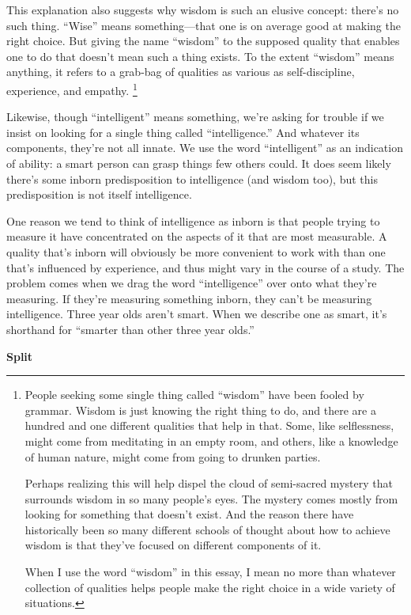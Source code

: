 This explanation also suggests why wisdom is such an elusive concept:
there's no such thing. ``Wise'' means something---that one is on average
good at making the right choice. But giving the name ``wisdom'' to the
supposed quality that enables one to do that doesn't mean such a thing
exists. To the extent ``wisdom'' means anything, it refers to a grab-bag
of qualities as various as self-discipline, experience, and empathy.
\footnote{People seeking some single thing called ``wisdom'' have been
fooled by grammar. Wisdom is just knowing the right thing to do, and
there are a hundred and one different qualities that help in that. Some,
like selflessness, might come from meditating in an empty room, and
others, like a knowledge of human nature, might come from going to
drunken parties.

Perhaps realizing this will help dispel the cloud of semi-sacred mystery
that surrounds wisdom in so many people's eyes. The mystery comes mostly
from looking for something that doesn't exist. And the reason there have
historically been so many different schools of thought about how to
achieve wisdom is that they've focused on different components of it.

When I use the word ``wisdom'' in this essay, I mean no more than
whatever collection of qualities helps people make the right choice in a
wide variety of situations.}

Likewise, though ``intelligent'' means something, we're asking for
trouble if we insist on looking for a single thing called
``intelligence.'' And whatever its components, they're not all innate.
We use the word ``intelligent'' as an indication of ability: a smart
person can grasp things few others could. It does seem likely there's
some inborn predisposition to intelligence (and wisdom too), but this
predisposition is not itself intelligence.

One reason we tend to think of intelligence as inborn is that people
trying to measure it have concentrated on the aspects of it that are
most measurable. A quality that's inborn will obviously be more
convenient to work with than one that's influenced by experience, and
thus might vary in the course of a study. The problem comes when we drag
the word ``intelligence'' over onto what they're measuring. If they're
measuring something inborn, they can't be measuring intelligence. Three
year olds aren't smart. When we describe one as smart, it's shorthand
for ``smarter than other three year olds.''

\textbf{Split}

